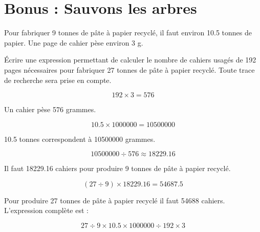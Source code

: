 \section{Bonus : Sauvons les arbres}

Pour fabriquer 9 tonnes de pâte à papier recyclé, il faut environ \num{10.5} tonnes de papier. Une page de cahier pèse environ 3 g.

\begin{questions}
	\question \'Ecrire une expression permettant de calculer le nombre de cahiers usagés de 192 pages nécessaires pour fabriquer 27 tonnes de pâte à papier recyclé. Toute trace de recherche sera prise en compte.
\end{questions}

\begin{solution}
	\begin{equation*}
		192 \times 3 = 576
	\end{equation*}
	
	Un cahier pèse 576 grammes.
	
	\begin{equation*}
		\num{10.5} \times \num{1000000} =\num{10 500 000}
	\end{equation*}
	
	\num{10.5} tonnes correspondent à \num{10 500 000} grammes.
	
	\begin{equation*}
		\num{10 500 000} \div 576 \approx \num{18229.16} 
	\end{equation*}
	
	Il faut \num{18229.16} cahiers pour produire 9 tonnes de pâte à papier recyclé.
	
	\begin{equation*}
		(27 \div 9) \times \num{18229.16} = \num{54687.5}
	\end{equation*}
	
	Pour produire 27 tonnes de pâte à papier recyclé il faut \num{54688} cahiers.\\
	
	L'expression complète est :
	
	\begin{equation*}
		27 \div 9 \times \num{10.5} \times \num{1000000} \div 192 \times 3
	\end{equation*}
\end{solution}